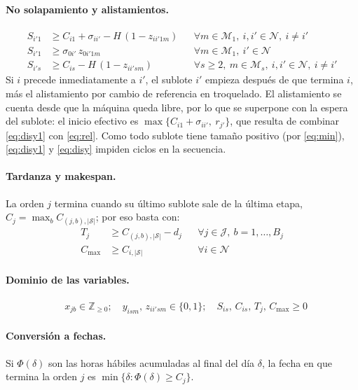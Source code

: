 \documentclass[11pt,a4paper]{article}
\newcommand{\J}{\mathcal{J}}
\newcommand{\Sg}{\mathcal{S}}
\newcommand{\N}{\mathcal{N}}
\newcommand{\M}{\mathcal{M}}
\begin{document}
\paragraph{No solapamiento y alistamientos.}
\begin{align}
  S_{i'1} &\ge C_{i1} + \sigma_{ii'} - H\,(1 - z_{ii'1m})
    && \forall m\in\M_1,\ i,i'\in\N,\ i\neq i' \label{eq:disy1}\\
  S_{i'1} &\ge \sigma_{0i'}\, z_{0i'1m}
    && \forall m\in\M_1,\ i'\in\N \label{eq:setup0}\\
  S_{i's} &\ge C_{is} - H\,(1 - z_{ii'sm})
    && \forall s\ge 2,\ m\in\M_s,\ i,i'\in\N,\ i\neq i' \label{eq:disy}
\end{align}
Si $i$ precede inmediatamente a $i'$, el sublote $i'$ empieza después de que
termina $i$, más el alistamiento por cambio de referencia en troquelado. El
alistamiento se cuenta desde que la máquina queda libre, por lo que se
superpone con la espera del sublote: el inicio efectivo es
$\max\{C_{i1} + \sigma_{ii'},\ r_{j'}\}$, que resulta de combinar
\eqref{eq:disy1} con \eqref{eq:rel}. Como todo sublote tiene tamaño positivo
(por \eqref{eq:min}), \eqref{eq:disy1} y \eqref{eq:disy} impiden ciclos en la
secuencia.

\paragraph{Tardanza y makespan.}
La orden $j$ termina cuando su último sublote sale de la última etapa,
$C_j = \max_b C_{(j,b),|\Sg|}$; por eso basta con:
\begin{align}
  T_j &\ge C_{(j,b),|\Sg|} - d_j
    && \forall j\in\J,\ b=1,\dots,B_j \label{eq:tj}\\
  C_{\max} &\ge C_{i,|\Sg|}
    && \forall i\in\N \label{eq:cmax}
\end{align}

\paragraph{Dominio de las variables.}
\begin{align}
  & x_{jb} \in \mathbb{Z}_{\ge 0};\quad
    y_{ism},\, z_{ii'sm} \in \{0,1\};\quad
    S_{is},\, C_{is},\, T_j,\, C_{\max} \ge 0 \label{eq:dom}
\end{align}

\paragraph{Conversión a fechas.}
Si $\Phi(\delta)$ son las horas hábiles acumuladas al final del día $\delta$,
la fecha en que termina la orden $j$ es
$\min\{\delta : \Phi(\delta) \ge C_j\}$.
\end{document}
